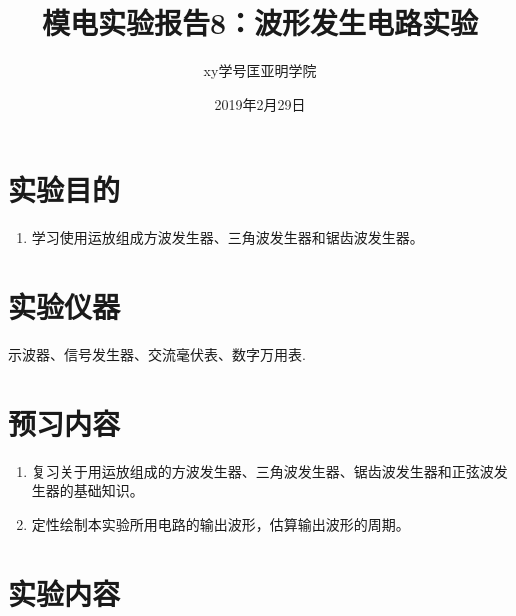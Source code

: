 \documentclass[a4paper]{article}
\title{模电实验报告8：波形发生电路实验}
\author{xy\quad 学号\quad 匡亚明学院}
\date{2019年2月29日}
\begin{document}
\maketitle


\section{实验目的}
\begin{enumerate}
\item 学习使用运放组成方波发生器、三角波发生器和锯齿波发生器。
\end{enumerate}

\section{实验仪器}
示波器、信号发生器、交流毫伏表、数字万用表.

\section{预习内容}
\begin{enumerate}
\item 复习关于用运放组成的方波发生器、三角波发生器、锯齿波发生器和正弦波发生器的基础知识。
\item 定性绘制本实验所用电路的输出波形，估算输出波形的周期。
\end{enumerate}

\section{实验内容}
\end{document}
